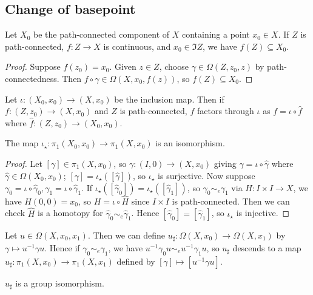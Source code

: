 \subsection{Change of basepoint}
\begin{lemma}
	Let \( X_0 \) be the path-connected component of \( X \) containing a point \( x_0 \in X \).
	If \( Z \) is path-connected, \( f \colon Z \to X \) is continuous, and \( x_0 \in \Im Z \), we have \( f(Z) \subseteq X_0 \).
\end{lemma}
\begin{proof}
	Suppose \( f(z_0) = x_0 \).
	Given \( z \in Z \), choose \( \gamma \in \Omega(Z,z_0,z) \) by path-connectedness.
	Then \( f \circ \gamma \in \Omega(X,x_0,f(z)) \), so \( f(Z) \subseteq X_0 \).
\end{proof}
Let \( \iota \colon (X_0,x_0) \to (X,x_0) \) be the inclusion map.
Then if \( f \colon (Z,z_0) \to (X,x_0) \) and \( Z \) is path-connected, \( f \) factors through \( \iota \) as \( f = \iota \circ \hat f \) where \( \hat f \colon (Z,z_0) \to (X_0,x_0) \).
\begin{lemma}
	The map \( \iota_\star \colon \pi_1(X_0,x_0) \to \pi_1(X,x_0) \) is an isomorphism.
\end{lemma}
\begin{proof}
	Let \( [\gamma] \in \pi_1(X,x_0) \), so \( \gamma \colon (I,0) \to (X,x_0) \) giving \( \gamma = \iota \circ \hat\gamma \) where \( \hat\gamma \in \Omega(X_0,x_0) \); \( [\gamma] = \iota_\star([\hat\gamma]) \), so \( \iota_\star \) is surjective.
	Now suppose \( \gamma_0 = \iota \circ \hat \gamma_0, \gamma_1 = \iota \circ \hat \gamma_1 \).
	If \( \iota_\star([\hat\gamma_0]) = \iota_\star([\hat\gamma_1]) \), so \( \gamma_0 \sim_e \gamma_1 \) via \( H \colon I \times I \to X \), we have \( H(0,0) = x_0 \), so \( H = \iota \circ \hat H \) since \( I \times I \) is path-connected.
	Then we can check \( \hat H \) is a homotopy for \( \hat \gamma_0 \sim_e \hat \gamma_1 \).
	Hence \( [\hat\gamma_0] = [\hat\gamma_1] \), so \( \iota_\star \) is injective.
\end{proof}
Let \( u \in \Omega(X,x_0,x_1) \).
Then we can define \( u_\sharp \colon \Omega(X,x_0) \to \Omega(X,x_1) \) by \( \gamma \mapsto u^{-1}\gamma u \).
Hence if \( \gamma_0 \sim_e \gamma_1 \), we have \( u^{-1}\gamma_0 u \sim_e u^{-1} \gamma_1 u \), so \( u_\sharp \) descends to a map \( u_\sharp \colon \pi_1(X,x_0) \to \pi_1(X,x_1) \) defined by \( [\gamma] \mapsto [u^{-1}\gamma u] \).
\begin{proposition}
	\( u_\sharp \) is a group isomorphism.
\end{proposition}
